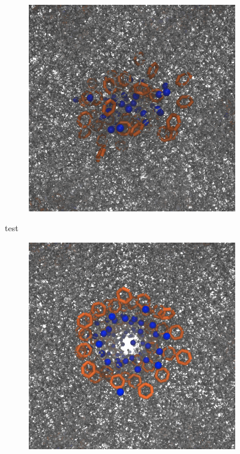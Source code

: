 \documentclass{article}
\begin{document}
\begin{figure}
\centering

\begin{subfigure}[t]{.3\textwidth}
\centering
\includegraphics[width=\linewidth]{disordered_pore.png}
        \caption{}\label{fig:disordered_pore}
\end{subfigure}
%
\begin{minipage}[t]{.3\textwidth}
	test
\end{minipage}
%
\begin{subfigure}[t]{.3\textwidth}
\centering
\includegraphics[width=\linewidth]{Ordered_Pore_orange.png}
\caption{}\label{fig:ordered_pore}
\end{subfigure}


\end{figure}
\end{document}
